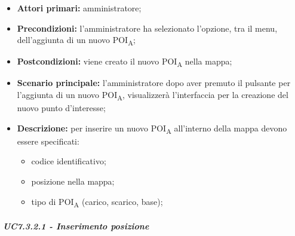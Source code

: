 \begin{itemize}

   \item   \textbf{Attori primari:} amministratore;

   \item   \textbf{Precondizioni:} l'amministratore ha selezionato l'opzione, tra il menu, dell'aggiunta di un nuovo POI\textsubscript{A};

  \item   \textbf{Postcondizioni:} viene creato il nuovo POI\textsubscript{A} nella mappa;

   \item   \textbf{Scenario principale:} l'amministratore dopo aver premuto il pulsante per l'aggiunta di un nuovo POI\textsubscript{A}, visualizzerà l'interfaccia per la creazione del nuovo punto d'interesse;

  \item   \textbf{Descrizione:} per inserire un nuovo POI\textsubscript{A} all'interno della mappa devono essere specificati:

  \begin{itemize}

       \item codice identificativo;

       \item posizione nella mappa;

       \item tipo di POI\textsubscript{A} (carico, scarico, base);

   \end{itemize}

\end{itemize}



\subparagraph{UC7.3.2.1 - Inserimento posizione}


